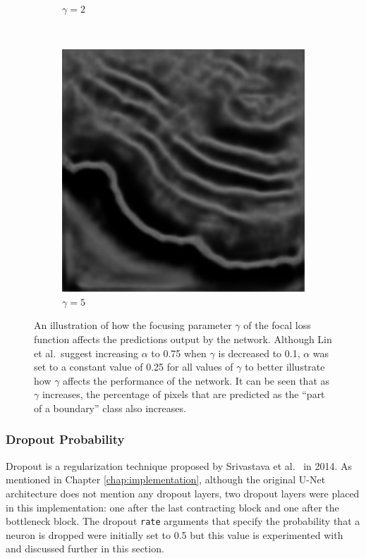 \begin{figure}[t]
\begin{subfigure}[t]{0.32\textwidth}
        \caption{$\gamma=2$}
    \end{subfigure}
    ~
    \begin{subfigure}[t]{0.32\textwidth}
        \centering
        \includegraphics[width=1\textwidth, valign=c]{images/focal_g5.png}
        \caption{$\gamma=5$}
    \end{subfigure}
    \caption{An illustration of how the focusing parameter $\gamma$ of the focal loss function affects the predictions output by the network. Although Lin et al.\ suggest increasing $\alpha$ to 0.75 when $\gamma$ is decreased to 0.1, $\alpha$ was set to a constant value of 0.25 for all values of $\gamma$ to better illustrate how $\gamma$ affects the performance of the network. It can be seen that as $\gamma$ increases, the percentage of pixels that are predicted as the ``part of a boundary'' class also increases.}
    \label{fig:lossfunctiondiff}
\end{figure}

\subsubsection{Dropout Probability}

Dropout is a regularization technique proposed by Srivastava et al.~\cite{dropout} in 2014. As mentioned in Chapter \ref{chap:implementation}, although the original U-Net architecture does not mention any dropout layers, two dropout layers were placed in this implementation: one after the last contracting block and one after the bottleneck block. The dropout \texttt{rate} arguments that specify the probability that a neuron is dropped were initially set to 0.5 but this value is experimented with and discussed further in this section.

